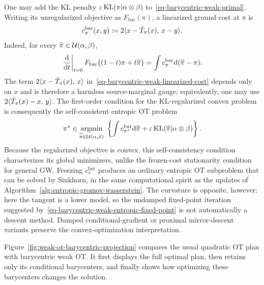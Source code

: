 One may add the KL penalty $\varepsilon\operatorname{KL}(\pi|\alpha\otimes\beta)$ to~\eqref{eq-barycentric-weak-primal}. Writing its unregularized objective as $F_{\mathrm{bar}}(\pi)$, a linearized ground cost at $\pi$ is
\begin{equation}\label{eq-barycentric-weak-linearized-cost}
	c_\pi^{\mathrm{bar}}(x,y)
	\coloneqq
	2\langle x-\bar T_\pi(x),\,x-y\rangle.
\end{equation}
Indeed, for every $\widehat\pi\in\mathcal{U}(\alpha,\beta)$,
\[
	\left.\frac{\mathrm{d}}{\mathrm{d} t}\right|_{t=0}
	F_{\mathrm{bar}}\bigl((1-t)\pi+t\widehat\pi\bigr)
	=
	\int c_\pi^{\mathrm{bar}}\mathrm{d}(\widehat\pi-\pi).
\]
The term $2\langle x-\bar T_\pi(x),\,x\rangle$ in~\eqref{eq-barycentric-weak-linearized-cost} depends only on $x$ and is therefore a harmless source-marginal gauge; equivalently, one may use $2\langle \bar T_\pi(x)-x,\,y\rangle$. The first-order condition for the KL-regularized convex problem is consequently the self-consistent entropic OT problem
\begin{equation}\label{eq-barycentric-weak-entropic-fixed-point}
	\pi^\star
	\in
	\underset{\widehat\pi\in\mathcal{U}(\alpha,\beta)}{\operatorname{argmin}}\;
	\left\{
		\int c_{\pi^\star}^{\mathrm{bar}}\mathrm{d}\widehat\pi
		+\varepsilon\operatorname{KL}(\widehat\pi|\alpha\otimes\beta)
	\right\}.
\end{equation}
Because the regularized objective is convex, this self-consistency condition characterizes its global minimizers, unlike the frozen-cost stationarity condition for general GW\@. Freezing $c_\pi^{\mathrm{bar}}$ produces an ordinary entropic OT subproblem that can be solved by Sinkhorn, in the same computational spirit as the updates of Algorithm~\ref{alg:entropic-gromov-wasserstein}. The curvature is opposite, however: here the tangent is a lower model, so the undamped fixed-point iteration suggested by~\eqref{eq-barycentric-weak-entropic-fixed-point} is not automatically a descent method. Damped conditional-gradient or proximal mirror-descent variants preserve the convex-optimization interpretation.

Figure~\ref{fig:weak-ot-barycentric-projection} compares the usual quadratic OT plan with barycentric weak OT\@. It first displays the full optimal plan, then retains only its conditional barycenters, and finally shows how optimizing these barycenters changes the solution.

